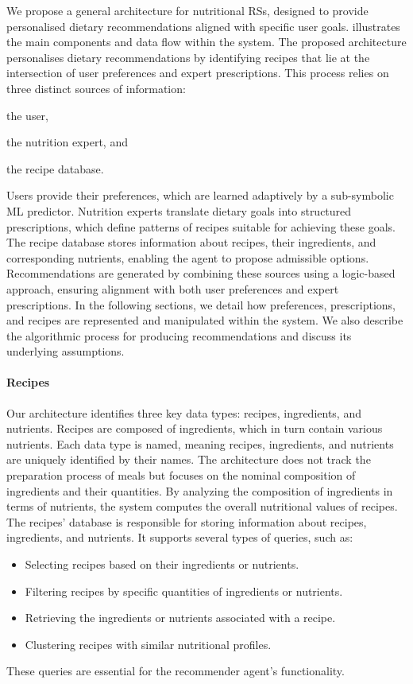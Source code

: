 We propose a general architecture for nutritional \glspl{RS}, designed to provide personalised dietary recommendations aligned with specific user goals.
%
 illustrates the main components and data flow within the system.
%
The proposed architecture personalises dietary recommendations by identifying recipes that lie at the intersection of user preferences and expert prescriptions.
%
This process relies on three distinct sources of information:
\begin{inlinelist}
    \item the user,
    \item the nutrition expert, and
    \item the recipe database.
\end{inlinelist}
%
Users provide their preferences, which are learned adaptively by a sub-symbolic \gls{ML} predictor.
%
Nutrition experts translate dietary goals into structured prescriptions, which define patterns of recipes suitable for achieving these goals.
%
The recipe database stores information about recipes, their ingredients, and corresponding nutrients, enabling the agent to propose admissible options.
%
Recommendations are generated by combining these sources using a logic-based approach, ensuring alignment with both user preferences and expert prescriptions.
%
In the following sections, we detail how preferences, prescriptions, and recipes are represented and manipulated within the system.
%
We also describe the algorithmic process for producing recommendations and discuss its underlying assumptions.


\paragraph{Recipes}\label{par:recipes}
%
Our architecture identifies three key data types: recipes, ingredients, and nutrients.
%
Recipes are composed of ingredients, which in turn contain various nutrients.
%
Each data type is named, meaning recipes, ingredients, and nutrients are uniquely identified by their names.
%
The architecture does not track the preparation process of meals but focuses on the nominal composition of ingredients and their quantities.
%
By analyzing the composition of ingredients in terms of nutrients, the system computes the overall nutritional values of recipes.
%
The recipes' database is responsible for storing information about recipes, ingredients, and nutrients.
%
It supports several types of queries, such as:
%
\begin{itemize}
  \item Selecting recipes based on their ingredients or nutrients.
  \item Filtering recipes by specific quantities of ingredients or nutrients.
  \item Retrieving the ingredients or nutrients associated with a recipe.
  \item Clustering recipes with similar nutritional profiles.
\end{itemize}
%
These queries are essential for the recommender agent's functionality.


